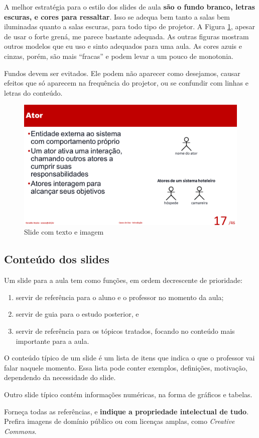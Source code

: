 A melhor estratégia para o estilo dos slides de aula \textbf{são o fundo branco, letras escuras, e cores para ressaltar}. Isso se adequa bem tanto a salas bem iluminadas quanto a salas escuras, para todo tipo de projetor. A Figura \ref{fig:teximag}, apesar de usar o forte grená, me parece bastante adequada. As outras figuras  mostram outros modelos que eu uso e sinto adequados para uma aula. As cores azuis e cinzas, porém, são mais ``fracas'' e podem levar a um pouco de monotonia.

Fundos devem ser evitados. Ele podem não aparecer como desejamos, causar efeitos que só aparecem na frequência do projetor, ou se confundir com linhas e letras do conteúdo.

\begin{figure}[hbt]
    \centering
    \includegraphics[width=\tam\linewidth,frame]{imagens/slidecomimage.png}
    \caption{Slide com texto e imagem}
    \label{fig:teximag}
\end{figure}

\subsection{Conteúdo dos slides}

Um slide para a aula tem como funções, em ordem decrescente de prioridade:
\begin{enumerate}
    \item servir de referência para o aluno e o professor no momento da aula;
    \item servir de guia para o estudo posterior, e
    \item servir de referência para os tópicos tratados, focando no conteúdo mais importante para a aula.
\end{enumerate}

O conteúdo típico de um slide é um lista de itens que indica o que o professor vai falar naquele momento. Essa lista pode conter exemplos, definições, motivação, dependendo da necessidade do slide.

Outro slide típico contém informações numéricas, na forma de gráficos e tabelas.

Forneça todas as referências, e \textbf{indique a propriedade intelectual de tudo}. Prefira imagens de domínio público ou com licenças amplas, como \textit{Creative Commons}.


